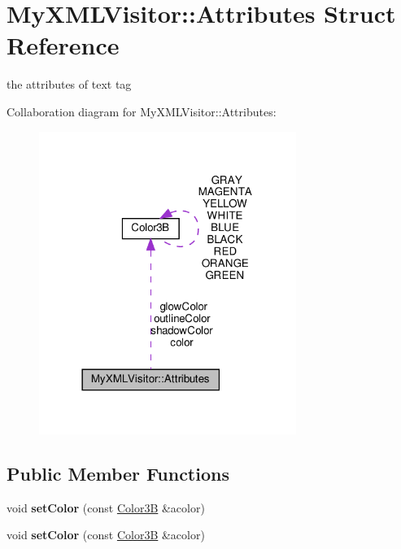 \hypertarget{structMyXMLVisitor_1_1Attributes}{}\section{My\+X\+M\+L\+Visitor\+:\+:Attributes Struct Reference}
\label{structMyXMLVisitor_1_1Attributes}


the attributes of text tag  




Collaboration diagram for My\+X\+M\+L\+Visitor\+:\+:Attributes\+:
\nopagebreak
\begin{figure}[H]
\begin{center}
\leavevmode
\includegraphics[width=237pt]{structMyXMLVisitor_1_1Attributes__coll__graph}
\end{center}
\end{figure}
\subsection*{Public Member Functions}
\begin{DoxyCompactItemize}
\item 
\mbox{\label{structMyXMLVisitor_1_1Attributes_adf02f0d4a74f696d7970f4c79a91adf6}} 
void {\bfseries set\+Color} (const \hyperlink{structColor3B}{Color3B} \&acolor)
\item 
\mbox{\label{structMyXMLVisitor_1_1Attributes_adf02f0d4a74f696d7970f4c79a91adf6}} 
void {\bfseries set\+Color} (const \hyperlink{structColor3B}{Color3B} \&acolor)
\end{DoxyCompactItemize}
